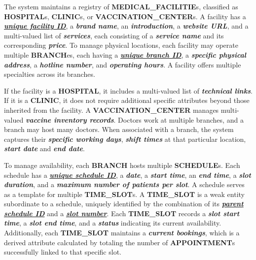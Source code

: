 \begin{sloppypar}
\par The system maintains a registry of \textbf{MEDICAL\_FACILITIE}s, classified as \textbf{HOSPITAL}s, \textbf{CLINIC}s, or \textbf{VACCINATION\_CENTER}s. A facility has a \textbf{\textit{\uline{unique facility ID}}}, a \textbf{\textit{brand name}}, an \textbf{\textit{introduction}}, a \textbf{\textit{website URL}}, and a multi-valued list of \textbf{\textit{services}}, each consisting of a \textbf{\textit{service name}} and its corresponding \textbf{\textit{price}}. To manage physical locations, each facility may operate multiple \textbf{BRANCH}es, each having a \textbf{\textit{\uline{unique branch ID}}}, a \textbf{\textit{specific physical address}}, a \textbf{\textit{hotline number}}, and \textbf{\textit{operating hours}}. A facility offers multiple specialties across its branches.

\par If the facility is a \textbf{HOSPITAL}, it includes a multi-valued list of \textbf{\textit{technical links}}. If it is a \textbf{CLINIC}, it does not require additional specific attributes beyond those inherited from the facility. A \textbf{VACCINATION\_CENTER} manages multi-valued \textbf{\textit{vaccine inventory records}}. Doctors work at multiple branches, and a branch may host many doctors. When associated with a branch, the system captures their \textbf{\textit{specific working days}}, \textbf{\textit{shift times}} at that particular location, \textbf{\textit{start date}} and \textbf{\textit{end date}}.

\par To manage availability, each \textbf{BRANCH} hosts multiple \textbf{SCHEDULE}s. Each schedule has a \textbf{\textit{\uline{unique schedule ID}}}, a \textbf{\textit{date}}, a \textbf{\textit{start time}}, an \textbf{\textit{end time}}, a \textbf{\textit{slot duration}}, and a \textbf{\textit{maximum number of patients per slot}}. A schedule serves as a template for multiple \textbf{TIME\_SLOT}s. A \textbf{TIME\_SLOT} is a weak entity subordinate to a schedule, uniquely identified by the combination of its \textbf{\textit{\uline{parent schedule ID}}} and a \textbf{\textit{\uline{slot number}}}. Each \textbf{TIME\_SLOT} records a \textbf{\textit{slot start time}}, a \textbf{\textit{slot end time}}, and a \textbf{\textit{status}} indicating its current availability. Additionally, each \textbf{TIME\_SLOT} maintains a \textbf{\textit{current bookings}}, which is a derived attribute calculated by totaling the number of \textbf{APPOINTMENT}s successfully linked to that specific slot.


\end{sloppypar}
